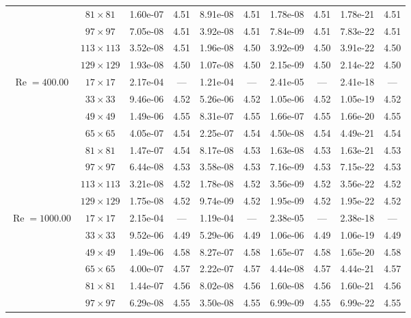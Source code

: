 \documentclass[preprint, 12pt]{elsarticle}
\begin{document}
\begin{center}
\begin{table}[H]
{\begin{tabular*}{\textwidth}{@{\extracolsep\fill}cccccccccc@{}}
    & $81\times 81$ & 1.60e-07 & 4.51 & 8.91e-08 & 4.51 & 1.78e-08 & 4.51 & 1.78e-21 & 4.51 \\
    & $97\times 97$ & 7.05e-08 & 4.51 & 3.92e-08 & 4.51 & 7.84e-09 & 4.51 & 7.83e-22 & 4.51 \\
    & $113\times 113$ & 3.52e-08 & 4.51 & 1.96e-08 & 4.50 & 3.92e-09 & 4.50 & 3.91e-22 & 4.50 \\
    & $129\times 129$ & 1.93e-08 & 4.50 & 1.07e-08 & 4.50 & 2.15e-09 & 4.50 & 2.14e-22 & 4.50 \\
    \hline
    \multirow{7}{*}{$\operatorname{Re}=400.00$} & $17\times 17$ & 2.17e-04 & --- & 1.21e-04 & --- & 2.41e-05 & --- & 2.41e-18 & --- \\
    & $33\times 33$ & 9.46e-06 & 4.52 & 5.26e-06 & 4.52 & 1.05e-06 & 4.52 & 1.05e-19 & 4.52 \\
    & $49\times 49$ & 1.49e-06 & 4.55 & 8.31e-07 & 4.55 & 1.66e-07 & 4.55 & 1.66e-20 & 4.55 \\
    \multirow{3}{*}{$\operatorname{Wi}=5$} & $65\times 65$ & 4.05e-07 & 4.54 & 2.25e-07 & 4.54 & 4.50e-08 & 4.54 & 4.49e-21 & 4.54 \\
    & $81\times 81$ & 1.47e-07 & 4.54 & 8.17e-08 & 4.53 & 1.63e-08 & 4.53 & 1.63e-21 & 4.53 \\
    & $97\times 97$ & 6.44e-08 & 4.53 & 3.58e-08 & 4.53 & 7.16e-09 & 4.53 & 7.15e-22 & 4.53 \\
    & $113\times 113$ & 3.21e-08 & 4.52 & 1.78e-08 & 4.52 & 3.56e-09 & 4.52 & 3.56e-22 & 4.52 \\
    & $129\times 129$ & 1.75e-08 & 4.52 & 9.74e-09 & 4.52 & 1.95e-09 & 4.52 & 1.95e-22 & 4.52 \\
    \hline
    \multirow{7}{*}{$\operatorname{Re}=1000.00$} & $17\times 17$ & 2.15e-04 & --- & 1.19e-04 & --- & 2.38e-05 & --- & 2.38e-18 & --- \\
    & $33\times 33$ & 9.52e-06 & 4.49 & 5.29e-06 & 4.49 & 1.06e-06 & 4.49 & 1.06e-19 & 4.49 \\
    & $49\times 49$ & 1.49e-06 & 4.58 & 8.27e-07 & 4.58 & 1.65e-07 & 4.58 & 1.65e-20 & 4.58 \\
    \multirow{3}{*}{$\operatorname{Wi}=5$} & $65\times 65$ & 4.00e-07 & 4.57 & 2.22e-07 & 4.57 & 4.44e-08 & 4.57 & 4.44e-21 & 4.57 \\
    & $81\times 81$ & 1.44e-07 & 4.56 & 8.02e-08 & 4.56 & 1.60e-08 & 4.56 & 1.60e-21 & 4.56 \\
    & $97\times 97$ & 6.29e-08 & 4.55 & 3.50e-08 & 4.55 & 6.99e-09 & 4.55 & 6.99e-22 & 4.55 \\

\end{tabular*}}
\end{table}
\end{center}
\end{document}
